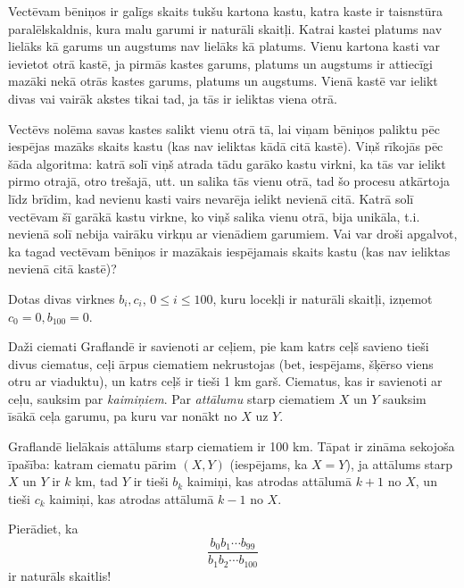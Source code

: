 \documentclass[11pt]{article}
\begin{document}
\begin{problem}[BW.TST.2019.6]
Vectēvam bēniņos ir galīgs skaits tukšu kartona kastu, katra kaste ir taisnstūra
paralēlskaldnis, kura malu garumi ir naturāli skaitļi. 
Katrai kastei platums nav lielāks kā garums un augstums nav lielāks kā platums. 
Vienu kartona kasti var ievietot otrā kastē, ja pirmās kastes  garums, platums un augstums 
ir attiecīgi mazāki nekā otrās kastes garums, platums un augstums. Vienā kastē var ielikt divas vai 
vairāk akstes tikai tad, ja tās ir ieliktas viena otrā. 

Vectēvs nolēma savas kastes salikt vienu otrā tā, lai viņam bēniņos paliktu pēc iespējas 
mazāks skaits kastu (kas nav ieliktas kādā citā kastē). Viņš rīkojās pēc šāda algoritma: 
katrā solī viņš atrada tādu garāko kastu virkni, ka tās var
ielikt pirmo otrajā, otro trešajā, utt. un salika tās vienu otrā, tad šo procesu 
atkārtoja līdz brīdim, kad nevienu kasti vairs nevarēja ielikt nevienā citā. 
Katrā solī vectēvam šī garākā kastu virkne, ko viņš salika vienu otrā, bija 
unikāla, t.i. nevienā solī nebija vairāku virkņu ar vienādiem garumiem. 
Vai var droši apgalvot, ka tagad vectēvam bēniņos ir mazākais iespējamais skaits kastu
(kas nav ieliktas nevienā citā kastē)?
\end{problem}

\begin{problem}[BW.TST.2019.7]
Dotas divas virknes $b_i, c_i$, $0 \leq i \leq 100$, kuru locekļi ir naturāli 
skaitļi, izņemot $c_0 = 0, b_{100} = 0$. 

Daži ciemati Graflandē ir savienoti ar ceļiem, pie kam katrs ceļš savieno 
tieši divus ciematus, ceļi ārpus ciematiem nekrustojas (bet, iespējams, 
šķērso viens otru ar viaduktu), un katrs ceļš ir 
tieši 1 km garš. Ciematus, kas ir savienoti ar ceļu, sauksim par 
{\em kaimiņiem}. Par {\em attālumu} starp ciematiem $X$ un $Y$ sauksim 
īsākā ceļa garumu, pa kuru var nonākt no $X$ uz $Y$. 

Graflandē lielākais attālums starp ciematiem ir 100 km. Tāpat ir zināma 
sekojoša īpašība: katram ciematu pārim $(X,Y)$ (iespējams, ka $X = Y$), 
ja attālums starp $X$ un $Y$ ir $k$ km, tad $Y$ ir tieši $b_k$ kaimiņi, 
kas atrodas attālumā $k+1$ no $X$, un tieši $c_k$ kaimiņi, kas 
atrodas attālumā $k-1$ no $X$. 

Pierādiet, ka 
\[ \frac{b_0b_1 \cdots b_{99}}{b_1b_2 \cdots b_{100}} \]
ir naturāls skaitlis!
\end{problem}
\end{document}
